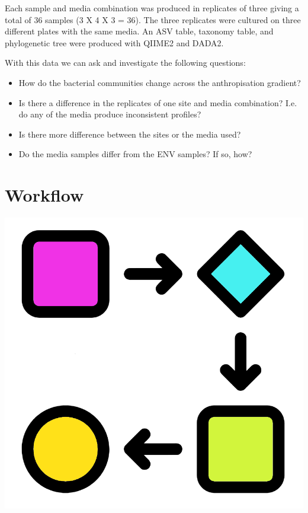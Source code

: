 \documentclass[
]{book}
\providecommand{\tightlist}{%
  \setlength{\itemsep}{0pt}\setlength{\parskip}{0pt}}
\begin{document}
Each sample and media combination was produced in replicates of three giving a total of 36 samples (3 X 4 X 3 = 36). The three replicates were cultured on three different plates with the same media. An ASV table, taxonomy table, and phylogenetic tree were produced with QIIME2 and DADA2.

With this data we can ask and investigate the following questions:

\begin{itemize}
\tightlist
\item
  How do the bacterial communities change across the anthropisation gradient?
\item
  Is there a difference in the replicates of one site and media combination? I.e. do any of the media produce inconsistent profiles?
\item
  Is there more difference between the sites or the media used?
\item
  Do the media samples differ from the ENV samples? If so, how?
\end{itemize}

\hypertarget{workflow}{%
\section{Workflow}\label{workflow}}

\includegraphics{figures/workflow.png}
\end{document}
